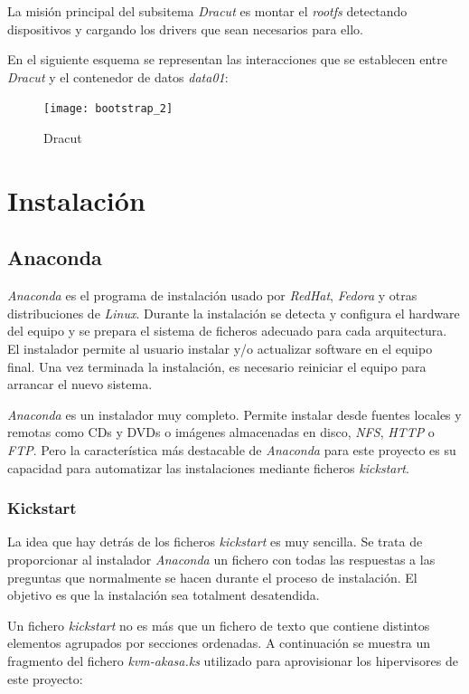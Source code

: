 \documentclass[a4paper,12pt,spanish,final]{epsc_tfc_pfc}
\begin{document}
La misión principal del subsitema \emph{Dracut} es montar el \emph{rootfs} detectando dispositivos y cargando los drivers que sean necesarios para ello.

En el siguiente esquema se representan las interacciones que se establecen entre \emph{Dracut} y el contenedor de datos \emph{data01}:\\

\begin{figure}[h]
  \centering
    \texttt{[image: bootstrap\_2]}
      \caption{Dracut}
\end{figure}

\section{Instalación}

\subsection{Anaconda}

\emph{Anaconda} es el programa de instalación usado por \emph{RedHat}, \emph{Fedora} y otras distribuciones de \emph{Linux}. Durante la instalación se detecta y configura el hardware del equipo y se prepara el sistema de ficheros adecuado para cada arquitectura. El instalador permite al usuario instalar y/o actualizar software en el equipo final. Una vez terminada la instalación, es necesario reiniciar el equipo para arrancar el nuevo sistema.

\emph{Anaconda} es un instalador muy completo. Permite instalar desde fuentes locales y remotas como CDs y DVDs o imágenes almacenadas en disco, \emph{NFS}, \emph{HTTP} o \emph{FTP}. Pero la característica más destacable de \emph{Anaconda} para este proyecto es su capacidad para automatizar las instalaciones mediante ficheros \emph{kickstart}.

\subsubsection{Kickstart}

La idea que hay detrás de los ficheros \emph{kickstart} es muy sencilla. Se trata de proporcionar al instalador \emph{Anaconda} un fichero con todas las respuestas a las preguntas que normalmente se hacen durante el proceso de instalación. El objetivo es que la instalación sea totalment desatendida.

Un fichero \emph{kickstart} no es más que un fichero de texto que contiene distintos elementos agrupados por secciones ordenadas. A continuación se muestra un fragmento del fichero \emph{kvm-akasa.ks} utilizado para aprovisionar los hipervisores de este proyecto:\\
\end{document}
